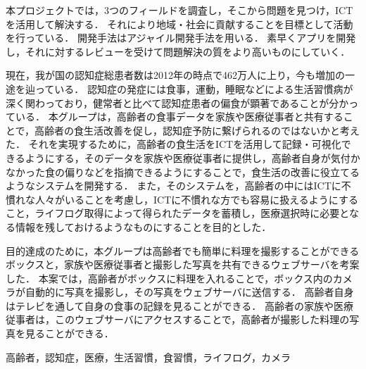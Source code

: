 \documentclass[../report]{subfiles}
\begin{document}
\begin{jabstract}
本プロジェクトでは，3つのフィールドを調査し，そこから問題を見つけ，ICTを活用して解決する．
それにより地域・社会に貢献することを目標として活動を行っている．
開発手法はアジャイル開発手法を用いる．
素早くアプリを開発し，それに対するレビューを受けて問題解決の質をより高いものにしていく．

現在，我が国の認知症総患者数は2012年の時点で462万人に上り，今も増加の一途を辿っている．
認知症の発症には食事，運動，睡眠などによる生活習慣病が深く関わっており，健常者と比べて認知症患者の偏食が顕著であることが分かっている．
本グループは，高齢者の食事データを家族や医療従事者と共有することで，高齢者の食生活改善を促し，認知症予防に繋げられるのではないかと考えた．
それを実現するために，高齢者の食生活をICTを活用して記録・可視化できるようにする，そのデータを家族や医療従事者に提供し，高齢者自身が気付かなかった食の偏りなどを指摘できるようにすることで，食生活の改善に役立てるようなシステムを開発する．
また，そのシステムを，高齢者の中にはICTに不慣れな人々がいることを考慮し，ICTに不慣れな方でも容易に扱えるようにすること，ライフログ取得によって得られたデータを蓄積し，医療選択時に必要となる情報を残しておけるようなものにすることを目的とした．

目的達成のために，本グループは高齢者でも簡単に料理を撮影することができるボックスと，家族や医療従事者と撮影した写真を共有できるウェブサーバを考案した．
本案では，高齢者がボックスに料理を入れることで，ボックス内のカメラが自動的に写真を撮影し，その写真をウェブサーバに送信する．
高齢者自身はテレビを通して自身の食事の記録を見ることができる．
高齢者の家族や医療従事者は，このウェブサーバにアクセスすることで，高齢者が撮影した料理の写真を見ることができる．
\begin{jkeyword}
高齢者，認知症，医療，生活習慣，食習慣，ライフログ，カメラ
\end{jkeyword}
\end{jabstract}
\end{document}
